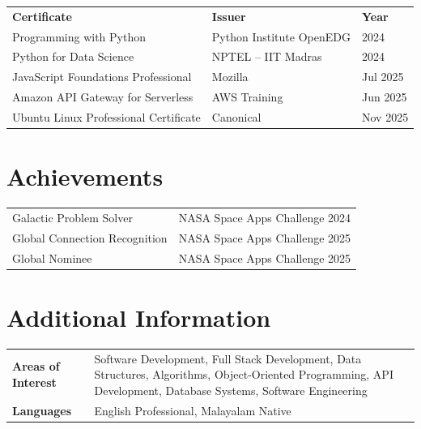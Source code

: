 \documentclass[a4paper,10pt]{article}
\begin{document}
\renewcommand{\arraystretch}{1.05}
\begin{tabular}{@{} p{7.8cm} p{6.5cm} p{2.5cm} @{}}
\textbf{Certificate}                  & \textbf{Issuer}              & \textbf{Year} \\[1pt]
Programming with Python               & Python Institute OpenEDG   & 2024 \\
Python for Data Science               & NPTEL -- IIT Madras          & 2024 \\
JavaScript Foundations Professional   & Mozilla                      & Jul 2025 \\
Amazon API Gateway for Serverless     & AWS Training                 & Jun 2025 \\
Ubuntu Linux Professional Certificate & Canonical                    & Nov 2025 \\
\end{tabular}

\section*{Achievements}

\begin{tabular}{@{} p{9.5cm} p{8cm} @{}}
Galactic Problem Solver              & NASA Space Apps Challenge 2024 \\
Global Connection Recognition        & NASA Space Apps Challenge 2025 \\
Global Nominee                       & NASA Space Apps Challenge 2025 \\
\end{tabular}

\section*{Additional Information}

\begin{tabular}{@{} >{\bfseries}p{3.8cm} p{13cm} @{}}
Areas of Interest & Software Development, Full Stack Development, Data Structures, Algorithms, Object-Oriented Programming, API Development, Database Systems, Software Engineering \\
Languages         & English Professional, Malayalam Native \\
\end{tabular}

\vspace{3pt}
\end{document}
